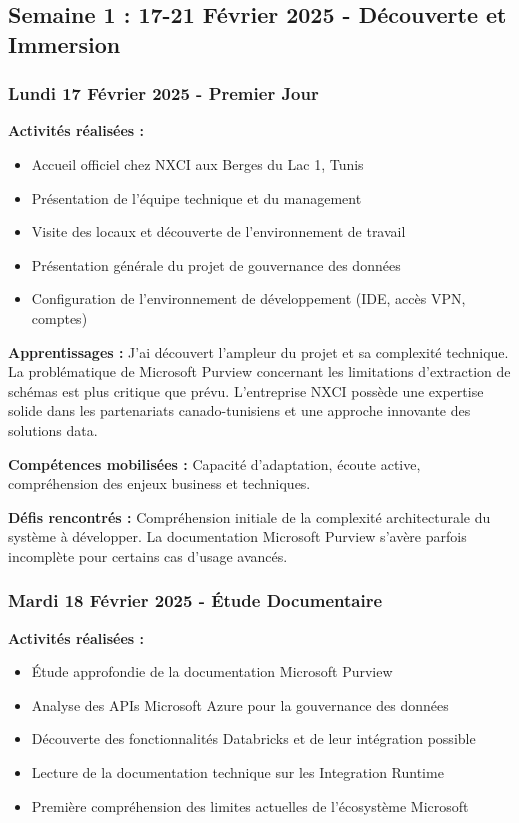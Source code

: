 \subsection{Semaine 1 : 17-21 Février 2025 - Découverte et Immersion}

\subsubsection{Lundi 17 Février 2025 - Premier Jour}

\textbf{Activités réalisées :}
\begin{itemize}
    \item Accueil officiel chez NXCI aux Berges du Lac 1, Tunis
    \item Présentation de l'équipe technique et du management
    \item Visite des locaux et découverte de l'environnement de travail
    \item Présentation générale du projet de gouvernance des données
    \item Configuration de l'environnement de développement (IDE, accès VPN, comptes)
\end{itemize}

\textbf{Apprentissages :}
J'ai découvert l'ampleur du projet et sa complexité technique. La problématique de Microsoft Purview concernant les limitations d'extraction de schémas est plus critique que prévu. L'entreprise NXCI possède une expertise solide dans les partenariats canado-tunisiens et une approche innovante des solutions data.

\textbf{Compétences mobilisées :}
Capacité d'adaptation, écoute active, compréhension des enjeux business et techniques.

\textbf{Défis rencontrés :}
Compréhension initiale de la complexité architecturale du système à développer. La documentation Microsoft Purview s'avère parfois incomplète pour certains cas d'usage avancés.

\subsubsection{Mardi 18 Février 2025 - Étude Documentaire}

\textbf{Activités réalisées :}
\begin{itemize}
    \item Étude approfondie de la documentation Microsoft Purview
    \item Analyse des APIs Microsoft Azure pour la gouvernance des données
    \item Découverte des fonctionnalités Databricks et de leur intégration possible
    \item Lecture de la documentation technique sur les Integration Runtime
    \item Première compréhension des limites actuelles de l'écosystème Microsoft
\end{itemize}

